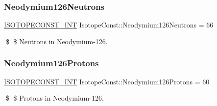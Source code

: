 \subsubsection{\texorpdfstring{Neodymium126\+Neutrons}{Neodymium126Neutrons}}
{\footnotesize\ttfamily \mbox{\hyperlink{group___isotope_const-_macros_ga5f18360b3e99483a35c32d789e62621c}{I\+S\+O\+T\+O\+P\+E\+C\+O\+N\+S\+T\+\_\+\+I\+NT}} Isotope\+Const\+::\+Neodymium126\+Neutrons = 66}

\$ \$ Neutrons in Neodymium-\/126. \mbox{\label{group___isotope_const-_neodymium-_nd126_gabbf55f8af8dd307b5b1063076541dd6f}} 
\subsubsection{\texorpdfstring{Neodymium126\+Protons}{Neodymium126Protons}}
{\footnotesize\ttfamily \mbox{\hyperlink{group___isotope_const-_macros_ga5f18360b3e99483a35c32d789e62621c}{I\+S\+O\+T\+O\+P\+E\+C\+O\+N\+S\+T\+\_\+\+I\+NT}} Isotope\+Const\+::\+Neodymium126\+Protons = 60}

\$ \$ Protons in Neodymium-\/126. 